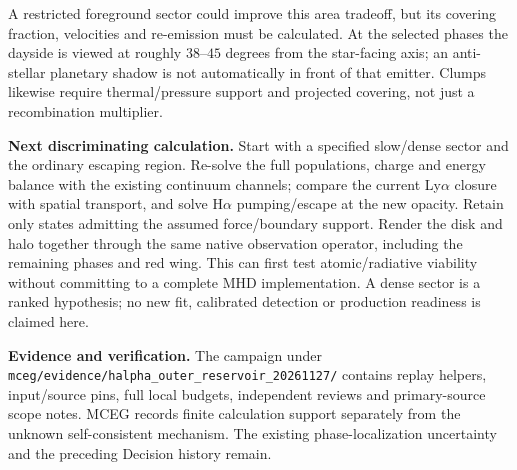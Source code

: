 \documentclass[10pt,a4paper]{article}
\begin{document}
A restricted foreground sector could improve this area tradeoff, but its
covering fraction, velocities and re-emission must be calculated. At the
selected phases the dayside is viewed at roughly $38$--$45$ degrees from
the star-facing axis; an anti-stellar planetary shadow is not automatically
in front of that emitter. Clumps likewise require thermal/pressure support
and projected covering, not just a recombination multiplier.

\textbf{Next discriminating calculation.}
Start with a specified slow/dense sector and the ordinary escaping region.
Re-solve the full populations, charge and energy balance with the existing
continuum channels; compare the current Ly$\alpha$ closure with spatial
transport, and solve H$\alpha$ pumping/escape at the new opacity. Retain only
states admitting the assumed force/boundary support. Render the disk and
halo together through the same native observation operator, including the
remaining phases and red wing. This can first test atomic/radiative viability
without committing to a complete MHD implementation. A dense sector is a
ranked hypothesis; no new fit, calibrated detection or production readiness
is claimed here.

\textbf{Evidence and verification.}
The campaign under
\texttt{mceg/evidence/halpha\_outer\_reservoir\_20261127/}
contains replay helpers, input/source pins, full local budgets, independent
reviews and primary-source scope notes. MCEG records finite calculation
support separately from the unknown self-consistent mechanism. The existing
phase-localization uncertainty and the preceding Decision history remain.
\end{document}
